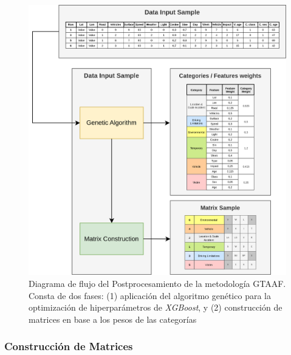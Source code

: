 \begin{figure}[H]
	\centering
	\includegraphics[width=14cm]{Figures/Postprocessing_2.png}
	\caption[Diagrama de flujo del Postprocesamiento de la metodología GTAAF]{Diagrama de flujo del Postprocesamiento de la metodología GTAAF. Consta de dos fases: (1) aplicación del algoritmo genético para la optimización de hiperparámetros de \textit{XGBoost}, y (2) construcción de matrices en base a los pesos de las categorías}
	\label{PostprocessingStage}
\end{figure}

\subsubsection{Construcción de Matrices}

